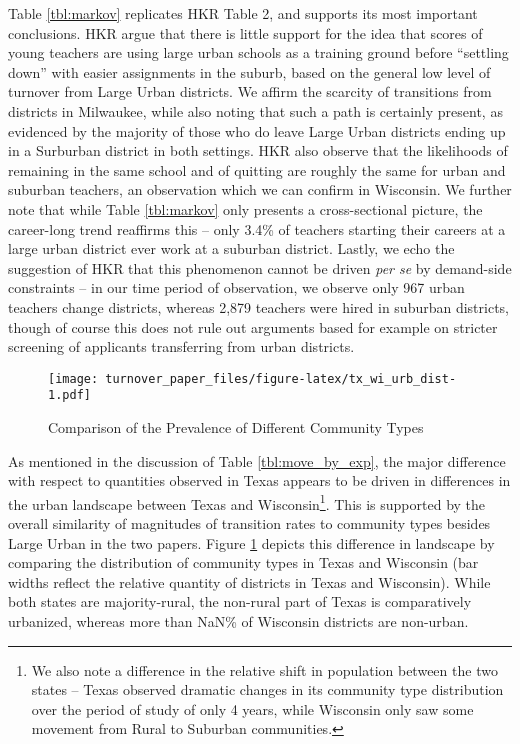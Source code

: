 \documentclass[12pt,]{article}
\let\rmarkdownfootnote\footnote%
\def\footnote{\protect\rmarkdownfootnote}
\begin{document}
Table \ref{tbl:markov} replicates HKR Table 2, and supports its most
important conclusions. HKR argue that there is little support for the
idea that scores of young teachers are using large urban schools as a
training ground before ``settling down'' with easier assignments in the
suburb, based on the general low level of turnover from Large Urban
districts. We affirm the scarcity of transitions from districts in
Milwaukee, while also noting that such a path is certainly present, as
evidenced by the majority of those who do leave Large Urban districts
ending up in a Surburban district in both settings. HKR also observe
that the likelihoods of remaining in the same school and of quitting are
roughly the same for urban and suburban teachers, an observation which
we can confirm in Wisconsin. We further note that while Table
\ref{tbl:markov} only presents a cross-sectional picture, the
career-long trend reaffirms this -- only 3.4\% of teachers starting
their careers at a large urban district ever work at a suburban
district. Lastly, we echo the suggestion of HKR that this phenomenon
cannot be driven \emph{per se} by demand-side constraints -- in our time
period of observation, we observe only 967 urban teachers change
districts, whereas 2,879 teachers were hired in suburban districts,
though of course this does not rule out arguments based for example on
stricter screening of applicants transferring from urban districts.

\begin{figure}[htbp]
\centering
\texttt{[image: turnover\_paper\_files/figure-latex/tx\_wi\_urb\_dist-1.pdf]}
\caption{\label{fig:ti_wi_urb}Comparison of the Prevalence of Different
Community Types}
\end{figure}

As mentioned in the discussion of Table \ref{tbl:move_by_exp}, the major
difference with respect to quantities observed in Texas appears to be
driven in differences in the urban landscape between Texas and
Wisconsin\footnote{We also note a difference in the relative shift in
  population between the two states -- Texas observed dramatic changes
  in its community type distribution over the period of study of only 4
  years, while Wisconsin only saw some movement from Rural to Suburban
  communities.}. This is supported by the overall similarity of
magnitudes of transition rates to community types besides Large Urban in
the two papers. Figure \ref{fig:ti_wi_urb} depicts this difference in
landscape by comparing the distribution of community types in Texas and
Wisconsin (bar widths reflect the relative quantity of districts in
Texas and Wisconsin). While both states are majority-rural, the
non-rural part of Texas is comparatively urbanized, whereas more than
NaN\% of Wisconsin districts are non-urban.
\end{document}
